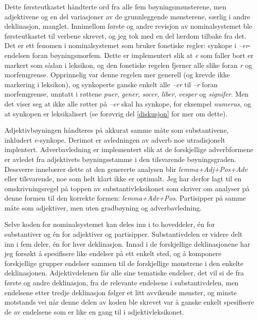 \documentclass{article}
\let\form\emph
\let\w\emph
\begin{document}
Dette f\o{}rsteutkastet h\aa{}ndterte ord fra alle fem
b\o{}yningsm\o{}nsterene, men adjektivene og en del variasjoner av de
grunnleggende m\o{}nsterene, s\ae{}rlig i andre deklinasjon, manglet.
Innimellom f\o{}rste og andre revisjon av nominalsystemet ble
f\o{}rsteutkastet til verbene skrevet, og jeg tok med en del l\ae{}rdom
tilbake fra det. Det er ett fenomen i nominalsystemet som bruker fonetiske
regler: synkope i \w{--er}-endelsen foran b\o{}yningsmorfem. Dette er
implementert slik at \w{e} som faller bort er markert som s\aa{}dan i
leksikon, og den fonetiske regelen fjerner alle slike foran \w{r} og
morfemgrense. Opprinnelig var denne regelen mer generell (og krevde ikke
markering i leksikon), og synkoperte ganske enkelt alle \w{--er} til \w{--r}
foran morfemgrense, unntatt i r\o{}ttene \w{puer}, \w{gener}, \w{socer},
\w{liber}, \w{vesper} og \w{signifer}. Men det viser seg at ikke alle
r\o{}tter p\aa{} \w{--er} skal ha synkope, for eksempel \w{numerus}, og at
synkopen er leksikalisert (se for\o{}vrig del \ref{diskusjon} for mer om
dette).

Adjektivb\o{}yningen h\aa{}ndteres p\aa{} akkurat samme m\aa{}te som
substantivene, inkludert \w{e}-synkope. Derimot er avledningen av adverb noe
utradisjonelt implentert. Adverbavledning er implementert slik at de
forskjellige adverbformene er avledet fra adjektivets b\o{}yningsstamme i den
tilsvarende b\o{}yningsgraden. Dessverre inneb\ae{}rer dette at den genererte
analysen blir \form{lemma+Adj+Pos+Adv} eller tilsvarende, noe som helt klart
ikke er optimalt. Jeg har derfor lagt til en omskrivningsregel p\aa{} toppen
av substantivleksikonet som skriver om analyser p\aa{} denne formen til den
korrekte formen: \form{lemma+Adv+Pos}. Partisipper p\aa{} samme m\aa{}te som
adjektiver, men uten gradb\o{}yning og adverbavledning.

Selve koden for nominalsystemet kan deles inn i to hoveddeler, \'en for
substantiver og \'en for adjektiver og partisipper. Substantivdelen er videre
delt inn i fem deler, \'en for hver deklinasjon. Innad i de forskjellige
deklinasjonene har jeg fors\o{}kt \aa{} spesifisere like endelser p\aa{} ett
enkelt sted, og \aa{} komponere forskjellige grupper endelser sammen til de
forskjellige m\o{}nstrene i den enkelte deklinasjonen. Adjektivdelenen f\aa{}r
alle sine tematiske endelser, det vil si de fra f\o{}rste og andre
deklinasjon, fra de relevante endelsene i substantivdelen, men endelsene etter
tredje deklinasjon f\o{}lger et litt avvikende m\o{}nster, og minste motstands
vei n\aa{}r denne delen av koden ble skrevet var \aa{} ganske enkelt
spesifisere de av endelsene som er like en gang til i adjektivleksikonet.
\end{document}
